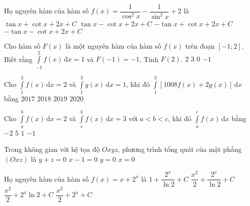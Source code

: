 \begin{ex}%
Họ nguyên hàm của hàm số $f(x)=\dfrac{1}{\cos^2 x}-\dfrac{1}{\sin^2 x}+2$ là
\choice
{\True $\tan x+\cot x+2x+C$}
{$\tan x-\cot x+2x+C$}
{$-\tan x+\cot x+2x+C$}
{$-\tan x-\cot x+2x+C$}
\end{ex}

\begin{ex}%
Cho hàm số $F(x)$ là một nguyên hàm của hàm số $f(x)$ trên đoạn $[-1; 2]$. Biết rằng $\displaystyle\int\limits_{-1}^2 f(x)\mathrm{\,d}x=1$ và $F(-1)=-1$. Tính $F(2)$.
\choice
{$2$}
{$3$}
{\True $0$}
{$-1$}
\end{ex}

\begin{ex}%
Cho $ \displaystyle \int\limits_1^3 f(x) \mathrm{\,d}x=2 $ và $ \displaystyle \int\limits_1^3 g(x) \mathrm{\,d}x=1 $, khi đó $ \displaystyle \int\limits_1^3 \left[1008 f(x)+2g(x)\right] \mathrm{\,d}x $ bằng
\choice
{$ 2017 $}
{\True $ 2018 $}
{$ 2019 $}
{$ 2020 $}
\end{ex}

\begin{ex}%
Cho $\displaystyle\int\limits_a^b f(x)\mathrm{\,d}x=2$ và $\displaystyle\int\limits_c^b f(x)\mathrm{\,d}x=3$ với $a<b<c$, khi đó $\displaystyle\int\limits_a^c f(x)\mathrm{\,d}x$ bằng
\choice
{$-2$}
{$5$}
{$1$}
{\True $-1$}
\end{ex}

\begin{ex}%
Trong không gian với hệ tọa độ $Oxyz$, phương trình tổng quát của mặt phẳng $(Oxz)$ là
\choice
{$y+z=0$}
{$x-1=0$}
{\True $y=0$}
{$x=0$}
\end{ex}

\begin{ex}%
Họ nguyên hàm của hàm số $f(x)=x+2^x$ là
\choice
{$1+\dfrac{2^x}{\ln 2}+C$}
{\True $\dfrac{x^2}{2}+\dfrac{2^x}{\ln 2}+C$}
{$\dfrac{x^2}{2}+2^x \ln 2+C$}
{$\dfrac{x^2}{2}+2^x+C$}
\end{ex}

